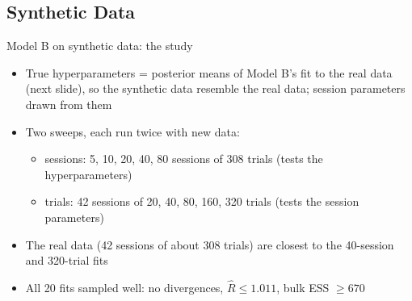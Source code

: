 \subsection{Synthetic Data}

\begin{frame}{Model B on synthetic data: the study}
  \begin{itemize}
    \item True hyperparameters = posterior means of Model B's fit to the real data (next slide),
          so the synthetic data resemble the real data; session parameters drawn from them
    \item Two sweeps, each run twice with new data:
    \begin{itemize}
      \item sessions: 5, 10, 20, 40, 80 sessions of 308 trials (tests the hyperparameters)
      \item trials: 42 sessions of 20, 40, 80, 160, 320 trials (tests the session parameters)
    \end{itemize}
    \item The real data (42 sessions of about 308 trials) are closest to the 40-session and
          320-trial fits
    \item All 20 fits sampled well: no divergences, $\hat{R} \le 1.011$, bulk ESS $\ge 670$
  \end{itemize}
\end{frame}

